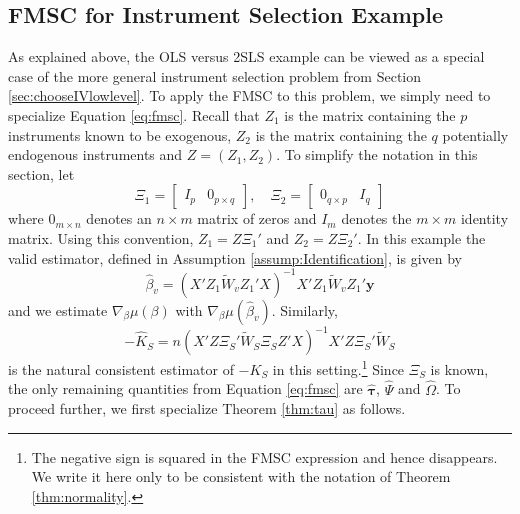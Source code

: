 \documentclass[12pt]{article}
\theoremstyle{definition}
\begin{document}
\subsection{FMSC for Instrument Selection Example}
\label{sec:chooseIVFMSC}
As explained above, the OLS versus 2SLS example can be viewed as a special case of the more general instrument selection problem from Section \ref{sec:chooseIVlowlevel}.
To apply the FMSC to this problem, we simply need to specialize Equation \ref{eq:fmsc}.
Recall that $Z_1$ is the matrix containing the $p$ instruments known to be exogenous, $Z_2$ is the matrix containing the $q$ potentially endogenous instruments and $Z = (Z_1, Z_2)$.
To simplify the notation in this section, let
\begin{equation}
\label{eq:xi12}
\Xi_1 = \left[\begin{array}{cc} I_{p} & 0_{p \times q}  \end{array}\right], \quad
    \Xi_2 = \left[ \begin{array}{cc}
              0_{q \times p}& I_{q}
            \end{array}\right]	
\end{equation}
where $0_{m\times n}$ denotes an $n\times m$ matrix of zeros and $I_m$ denotes the $m\times m$ identity matrix.
Using this convention, $Z_1 = Z \Xi_1'$ and $Z_2 = Z \Xi_2'$.
In this example the valid estimator, defined in Assumption \ref{assump:Identification}, is given by
\begin{equation}
\label{eq:betav}
\widehat{\beta}_v = \left(X'Z_1 \widetilde{W}_v Z_1' X\right)^{-1}X'Z_1 \widetilde{W}_v Z_1' \mathbf{y}	
\end{equation}
and we estimate $\nabla_\beta \mu(\beta)$ with $\nabla_\beta \mu(\widehat{\beta}_v)$.  
Similarly, 
$$-\widehat{K}_S = n\left(X'Z \Xi_S' \widetilde{W}_S \Xi_S Z' X\right)^{-1}X' Z \Xi_S' \widetilde{W}_S$$
is the natural consistent estimator of $-K_S$ in this setting.\footnote{The negative sign is squared in the FMSC expression and hence disappears. We write it here only to be consistent with the notation of Theorem \ref{thm:normality}.}
Since $\Xi_S$ is known, the only remaining quantities from Equation \ref{eq:fmsc} are $\widehat{\boldsymbol{\tau}}$, $\widehat{\Psi}$ and $\widehat{\Omega}$. 
To proceed further, we first specialize Theorem \ref{thm:tau} as follows.
\end{document}

